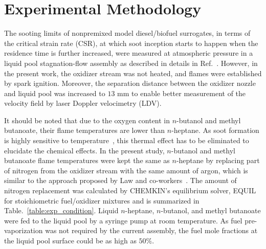 \documentclass[review,3p,times]{elsarticleUS}
\begin{document}
\section{Experimental Methodology}

The sooting limits of nonpremixed model diesel/biofuel surrogates, in terms of the critical strain rate (CSR), at which soot inception starts to happen when the residence time is further increased, were measured at atmospheric pressure in a liquid pool stagnation-flow assembly as described in details in Ref.~\cite{liu10}. However, in the present work, the oxidizer stream was not heated, and flames were established by spark ignition. Moreover, the separation distance between the oxidizer nozzle and liquid pool was increased to $13$ mm to enable better measurement of the velocity field by laser Doppler velocimetry (LDV).

It should be noted that due to the oxygen content in $n$-butanol and methyl butanoate, their flame temperatures are lower than $n$-heptane. As soot formation is highly sensitive to temperature~\cite{wang11}, this thermal effect has to be eliminated to elucidate the chemical effects. In the present study, $n$-butanol and methyl butanoate flame temperatures were kept the same as $n$-heptane by replacing part of nitrogen from the oxidizer stream with the same amount of argon, which is similar to the approach proposed by Law and co-workers~\cite{du89,du91,axelbaum91}. The amount of nitrogen replacement was calculated by CHEMKIN's equilibrium solver, EQUIL\cite{chemkin} for stoichiometric fuel/oxidizer mixtures and is summarized in Table.~\ref{table:exp_condition}. Liquid $n$-heptane, $n$-butanol, and methyl butanoate were fed to the liquid pool by a syringe pump at room temperature. As fuel pre-vaporization was not required by the current assembly, the fuel mole fractions at the liquid pool surface could be as high as $50\%$.
\end{document}
